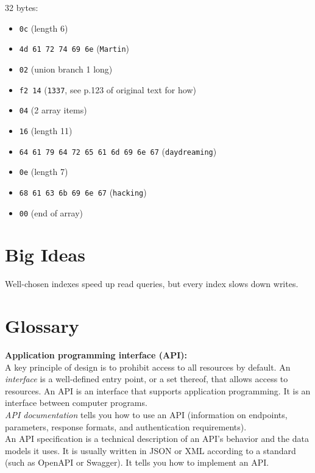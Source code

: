 \documentclass[12pt, titlepage]{article}
\begin{document}
32 bytes:

\begin{itemize}
    \item \texttt{0c} (length 6)
    \item \texttt{4d 61 72 74 69 6e} (\texttt{Martin})
    \item \texttt{02} (union branch 1 \textrightarrow long)
    \item \texttt{f2 14} (\texttt{1337}, see p.123 of original text for how)
    \item \texttt{04} (2 array items)
    \item \texttt{16} (length 11)
    \item \texttt{64 61 79 64 72 65 61 6d 69 6e 67} (\texttt{daydreaming})
    \item \texttt{0e} (length 7)
    \item \texttt{68 61 63 6b 69 6e 67} (\texttt{hacking})
    \item \texttt{00} (end of array)
\end{itemize}

\section{Big Ideas}

Well-chosen indexes speed up read queries, but every index slows down writes.

\section{Glossary}

\textbf{Application programming interface (API):} \\

A key principle of design is to prohibit access to all resources by default. An \textit{interface} is a well-defined entry point, or a set thereof, that allows access to resources. An API is an interface that supports application programming. It is an interface between computer programs. \\

\textit{API documentation} tells you how to use an API (information on endpoints, parameters, response formats, and authentication requirements). \\

An API specification is a technical description of an API's behavior and the data models it uses. It is usually written in JSON or XML according to a standard (such as OpenAPI or Swagger). It tells you how to implement an API. \\
\end{document}
